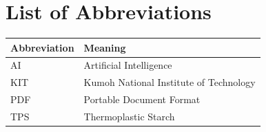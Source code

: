 \chapter*{List of Abbreviations}

\begin{singlespace}
    \begin{tabular}{@{}ll@{}}
        \textbf{Abbreviation} & \textbf{Meaning} \\
        \midrule
        AI & Artificial Intelligence \\
        KIT & Kumoh National Institute of Technology \\
        PDF & Portable Document Format \\
        TPS & Thermoplastic Starch \\
    \end{tabular}
\end{singlespace}

\clearpage
